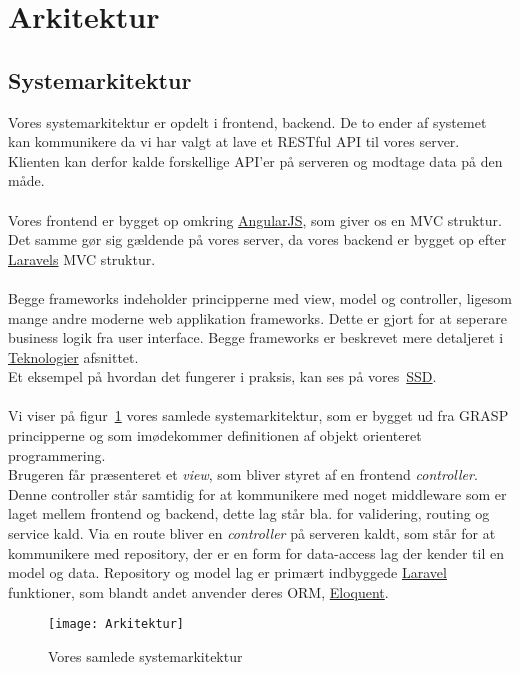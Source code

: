 \section{Arkitektur}
\subsection{Systemarkitektur}
Vores systemarkitektur er opdelt i frontend, backend.
De to ender af systemet kan kommunikere da vi har valgt at lave et RESTful API til vores server.
Klienten kan derfor kalde forskellige API'er på serveren og modtage data på den måde.
\\\\
Vores frontend er bygget op omkring \hyperlink{AngularJS}{AngularJS}, som giver os en MVC struktur.
Det samme gør sig gældende på vores server, da vores backend er bygget op efter \hyperlink{Laravel}{Laravels} MVC struktur.
\\\\
Begge frameworks indeholder principperne med view, model og controller, ligesom mange andre moderne web applikation frameworks.
Dette er gjort for at seperare business logik fra user interface. Begge frameworks er beskrevet mere detaljeret i \hyperlink{Teknologier}{Teknologier} afsnittet.
\\
Et eksempel på hvordan det fungerer i praksis, kan ses på vores~\hyperref[fig:ssd]{SSD}.
\\\\
Vi viser på figur~\ref{fig:arkitektur} vores samlede systemarkitektur, som er bygget ud fra GRASP principperne og som imødekommer definitionen af objekt orienteret programmering.\\
Brugeren får præsenteret et \textit{view}, som bliver styret af en frontend \textit{controller}. Denne controller står samtidig for at kommunikere med noget middleware som er laget mellem frontend og backend, dette lag står bla. for validering, routing og service kald. Via en route bliver en \textit{controller} på serveren kaldt, som står for at kommunikere med repository, der er en form for data-access lag der kender til en model og data. Repository og model lag er primært indbyggede \hyperlink{Laravel}{Laravel} funktioner, som blandt andet anvender deres ORM, \href{http://laravel.com/docs/5.1/eloquent}{Eloquent}.
\begin{figure}[H]
\texttt{[image: Arkitektur]}
\caption{Vores samlede systemarkitektur}
\label{fig:arkitektur}
\end{figure}
